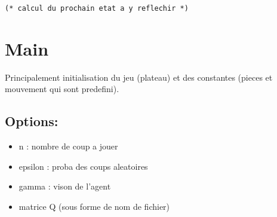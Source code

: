 \documentclass{article}
\begin{document}
\begin{lstlisting}
(* calcul du prochain etat a y reflechir *)
\end{lstlisting}

\section{Main}

Principalement initialisation du jeu (plateau) et des constantes (pieces et
mouvement qui sont predefini).


\subsection{Options:}
\begin{itemize}
	\item n : nombre de coup a jouer
	\item epsilon : proba des coups aleatoires
	\item gamma : vison de l'agent
	\item matrice Q (sous forme de nom de fichier)
\end{itemize}
\end{document}
